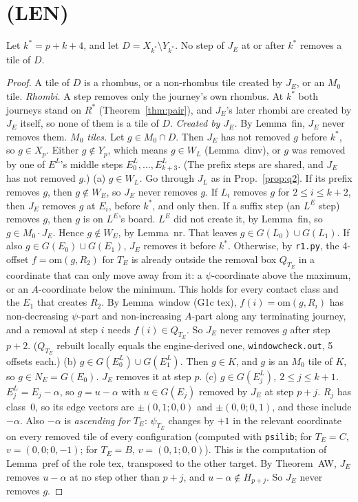 \documentclass[11pt]{article}
\theoremstyle{remark}\newtheorem{remark}[theorem]{Remark}
\begin{document}
\section{(LEN)}
\begin{lemma}\label{lem:stale}
Let $k^*=p+k+4$, and let $D=X_{k^*}\setminus Y_{k^*}$. No step of $J_E$ at or after $k^*$ removes a tile of $D$.
\end{lemma}
\begin{proof}
A tile of $D$ is a rhombus, or a non-rhombus tile created by $J_E$, or an $M_0$ tile.
\emph{Rhombi.} A step removes only the journey's own rhombus. At $k^*$ both journeys stand on $R^*$ (Theorem~\ref{thm:pair}), and $J_E$'s later rhombi are created by $J_E$ itself, so none of them is a tile of $D$.
\emph{Created by $J_E$.} By Lemma~fin, $J_E$ never removes them.
\emph{$M_0$ tiles.} Let $g\in M_0\cap D$. Then $J_E$ has not removed $g$ before $k^*$, so $g\in X_p$. Either $g\notin Y_p$, which means $g\in W_L$ (Lemma~dinv), or $g$ was removed by one of $E^L$'s middle steps $E^L_0,\dots,E^L_{k+3}$. (The prefix steps are shared, and $J_E$ has not removed $g$.)
(a) \emph{$g\in W_L$.} Go through $J_L$ as in Prop.~\ref{prop:q2}. If its prefix removes $g$, then $g\notin W_E$, so $J_E$ never removes $g$. If $L_i$ removes $g$ for $2\le i\le k+2$, then $J_E$ removes $g$ at $E_i$, before $k^*$, and only then. If a suffix step (an $L^E$ step) removes $g$, then $g$ is on $L^E$'s board. $L^E$ did not create it, by Lemma~fin, so $g\in M_0\cdot J_E$. Hence $g\notin W_E$, by Lemma~nr. That leaves $g\in G(L_0)\cup G(L_1)$. If also $g\in G(E_0)\cup G(E_1)$, $J_E$ removes it before $k^*$. Otherwise, by \texttt{r1.py}, the 4-offset $f=\mathrm{om}(g,R_2)$ for $T_E$ is already outside the removal box $Q_{T_E}$ in a coordinate that can only move away from it: a $\psi$-coordinate above the maximum, or an $A$-coordinate below the minimum. This holds for every contact class and the $E_1$ that creates $R_2$. By Lemma~window (G1c tex), $f(i)=\mathrm{om}(g,R_i)$ has non-decreasing $\psi$-part and non-increasing $A$-part along any terminating journey, and a removal at step $i$ needs $f(i)\in Q_{T_E}$. So $J_E$ never removes $g$ after step $p+2$. ($Q_{T_E}$ rebuilt locally equals the engine-derived one, \texttt{windowcheck.out}, 5 offsets each.)
(b) \emph{$g\in G(E^L_0)\cup G(E^L_1)$.} Then $g\in K$, and $g$ is an $M_0$ tile of $K$, so $g\in N_E=G(E_0)$. $J_E$ removes it at step $p$.
(c) \emph{$g\in G(E^L_j)$, $2\le j\le k+1$.} $E^L_j=E_j-\alpha$, so $g=u-\alpha$ with $u\in G(E_j)$ removed by $J_E$ at step $p+j$. $R_j$ has class~0, so its edge vectors are $\pm(0,1;0,0)$ and $\pm(0,0;0,1)$, and these include $-\alpha$. Also $-\alpha$ is \emph{ascending for $T_E$}: $\psi_{T_E}$ changes by $+1$ in the relevant coordinate on every removed tile of every configuration (computed with \texttt{psilib}; for $T_E=C$, $v=(0,0;0,-1)$; for $T_E=B$, $v=(0,1;0,0)$). This is the computation of Lemma~pref of the role tex, transposed to the other target. By Theorem~AW, $J_E$ removes $u-\alpha$ at no step other than $p+j$, and $u-\alpha\notin H_{p+j}$. So $J_E$ never removes $g$.

\end{proof}
\end{document}
